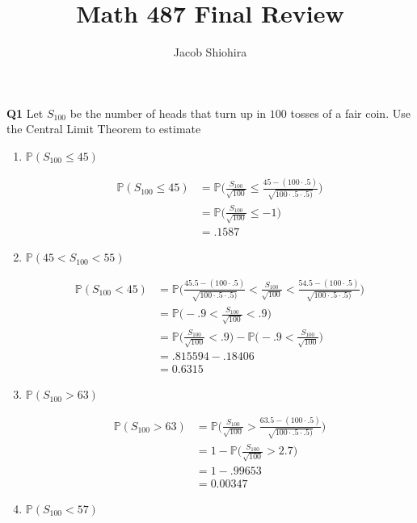 \documentclass[12pt]{article}
\begin{document}
\title{Math 487 Final Review}
\author{Jacob Shiohira}
\maketitle

\noindent
\textbf{Q1} Let $S_{100}$ be the number of heads that turn up in $100$ tosses of a fair coin. Use the Central Limit Theorem to estimate

\begin{enumerate}[label=(\alph*)]
\item $\mathbb{P}(S_{100} \leq 45)$

\begin{align*}
\mathbb{P}(S_{100} \leq 45) &= \mathbb{P}\Bigg ( \frac{S_{100}}{\sqrt{100}} \leq \frac{45-(100 \cdot .5)}{\sqrt{100 \cdot .5 \cdot .5)}} \Bigg ) \\
&= \mathbb{P} \Bigg ( \frac{S_{100}}{\sqrt{100}} \leq -1 \Bigg ) \\
&= .1587
\end{align*}

\item $\mathbb{P}(45 < S_{100} < 55)$

\begin{align*}
\mathbb{P}(S_{100} < 45) &= \mathbb{P}\Bigg (\frac{45.5-(100 \cdot .5)}{\sqrt{100 \cdot .5 \cdot .5)}} < \frac{S_{100}}{\sqrt{100}} < \frac{54.5-(100 \cdot .5)}{\sqrt{100 \cdot .5 \cdot .5)}} \Bigg ) \\
&= \mathbb{P} \Bigg (-.9 < \frac{S_{100}}{\sqrt{100}} < .9 \Bigg ) \\
&= \mathbb{P} \Bigg (\frac{S_{100}}{\sqrt{100}} < .9 \Bigg )  - \mathbb{P} \Bigg (-.9 < \frac{S_{100}}{\sqrt{100}} \Bigg ) \\
&= .815594 - .18406 \\
& = 0.6315
\end{align*}

\item $\mathbb{P}(S_{100} > 63)$

\begin{align*}
\mathbb{P}(S_{100} > 63) &= \mathbb{P}\Bigg ( \frac{S_{100}}{\sqrt{100}} > \frac{63.5 - (100 \cdot .5)}{\sqrt{100 \cdot .5 \cdot .5)}} \Bigg ) \\
&= 1- \mathbb{P}\Bigg ( \frac{S_{100}}{\sqrt{100}} > 2.7 \Bigg ) \\
&= 1- .99653 \\
&= 0.00347
\end{align*}

\item $\mathbb{P}(S_{100} < 57)$
\end{enumerate}
\end{document}

